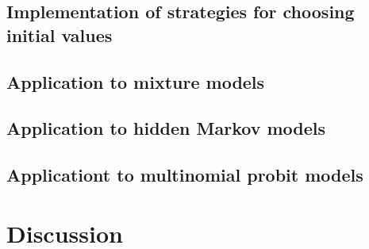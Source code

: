 \hypertarget{implementation-of-strategies-for-choosing-initial-values}{%
\subsection{Implementation of strategies for choosing initial values}\label{implementation-of-strategies-for-choosing-initial-values}}

\hypertarget{application-to-mixture-models}{%
\subsection{Application to mixture models}\label{application-to-mixture-models}}

\hypertarget{application-to-hidden-markov-models}{%
\subsection{Application to hidden Markov models}\label{application-to-hidden-markov-models}}

\hypertarget{applicationt-to-multinomial-probit-models}{%
\subsection{Applicationt to multinomial probit models}\label{applicationt-to-multinomial-probit-models}}

\hypertarget{discussion}{%
\section{Discussion}\label{discussion}}



\address{%
Lennart Oelschläger\\
Bielefeld University\\%
Department of Business Administration and Economics\\ Bielefeld, Germany\\
%
\url{https://loelschlaeger.de/}\\%
%
\href{mailto:lennart.oelschlaeger@uni-bielefeld.de}{\nolinkurl{lennart.oelschlaeger@uni-bielefeld.de}}%
}

\address{%
Marius Ötting\\
Bielefeld University\\%
Department of Business Administration and Economics\\ Bielefeld, Germany\\
%
\url{https://www.uni-bielefeld.de/fakultaeten/wirtschaftswissenschaften/lehrbereiche/stats/team/marius-otting-(m.sc}.)/\\%
\textit{ORCiD: \href{https://orcid.org/0000-0002-9373-0365}{0000-0002-9373-0365}}\\%
\href{mailto:marius.oetting@uni-bielefeld.de}{\nolinkurl{marius.oetting@uni-bielefeld.de}}%
}
